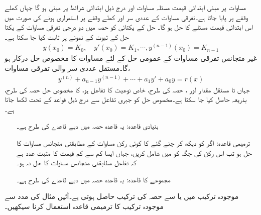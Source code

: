 مساوات  پر مبنی ابتدائی قیمت مسئلہ مساوات  اور درج ذیل  ابتدائی شرائط پر مبنی ہو گا جہاں  کھلے وقفے  پر پایا جاتا ہے۔تفرقی مساوات کے عددی سر اور  کھلے وقفے پر استمراری ہونے کی صورت میں اس ابتدائی قیمت مسئلے کا حل  ہو گا۔ حل کے یکتائی کو حصہ  میں دو درجی تفرقی مساوات کے یکتا حل کے ثبوت کے نمونے پر ثابت کیا جا سکتا ہے۔
\begin{align}
y(x_0)=K_0, \quad y'(x_0)=K_1, \cdots , y^{(n-1)}(x_0)=K_{n-1}
\end{align}
غیر متجانس تفرقی مساوات  کے عمومی حل کے لئے مساوات  کا مخصوص حل درکار ہو گا۔مستقل عددی سر والی تفرقی مساوات،
\begin{align}\label{مساوات_سادہ_بلند_مستقل_عددی_سر_غیر_متجانس_الف}
y^{(n)}+a_{n-1}y^{(n-1)}+\cdots+a_1y'+a_0 y=r(x)
\end{align}
جہاں  تا  مستقل مقدار اور ، حصہ  کی طرح، خاص نوعیت کا تفاعل ہو، کا مخصوص حل  حصہ  کی طرح، بذریعہ  حاصل کیا جا سکتا ہے۔مخصوص حل  کو جبری تفاعل  سے درج ذیل قواعد کے تحت لکھا جاتا ہے۔
\begin{enumerate}
\item[بنیادی قاعدہ:]\label{قاعدہ_سادہ_بلند_بنیادی_قاعدہ}
یہ قاعدہ حصہ  میں دیے قاعدے  کی طرح ہے۔
\item[ترمیمی قاعدہ:]\label{قاعدہ_سادہ_بلند_ترمیمی_قاعدہ}
اگر  کو دیکھ کر چنے گئے   کا کوئی رکن   مساوات  کے  مطابقتی متجانس مساوات کا حل  ہو تب  اس رکن کی جگہ  کو   میں شامل کریں، جہاں  ایسا کم سے کم قیمت کا مثبت عدد ہے کہ تفاعل  مطابقتی متجانس مساوات کا حل نہ ہو۔
\item[مجموعے کا قاعدہ:]\label{قاعدہ_سادہ_بلند_مجموعہ_قاعدہ}
یہ قاعدہ حصہ  میں دیے قاعدے کی طرح ہے۔
\end{enumerate} 

موجودہ ترکیب میں  یا  سے حصہ  کی ترکیب حاصل ہوتی ہے۔آئیں مثال کی مدد سے موجودہ ترکیب کا ترمیمی قاعدہ  استعمال کرنا سیکھیں۔

